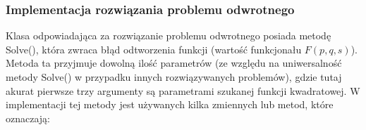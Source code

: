 \documentclass[twoside]{projektInzynierskiMS1}
\newcommand{\si}{ś}
\begin{document}








\subsubsection{Implementacja rozwiązania problemu odwrotnego}

Klasa odpowiadająca za rozwiązanie problemu odwrotnego posiada metodę Solve(), która zwraca błąd odtworzenia funkcji (warto\si ć funkcjonału $F(p, q, s)$). Metoda ta przyjmuje dowolną ilo\si ć parametrów (ze względu na uniwersalno\si ć metody Solve() w przypadku innych rozwiązywanych problemów), gdzie tutaj akurat pierwsze trzy argumenty są parametrami szukanej funkcji kwadratowej. W implementacji tej metody jest używanych kilka zmiennych lub metod, które oznaczają:\\
\end{document}
